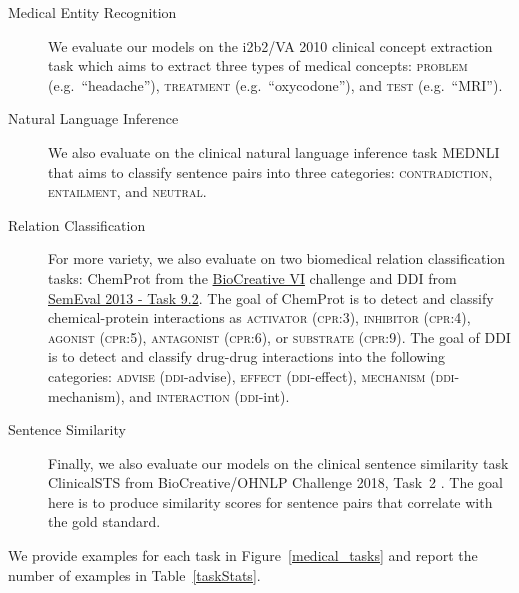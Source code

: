 \documentclass[11pt]{article}
\begin{document}
\begin{description}
    \item[Medical Entity Recognition] We evaluate our models on the i2b2/VA 2010 \cite{uzuner20112010} clinical concept extraction task which aims to extract three types of medical concepts: \textsc{problem} (e.g.\ ``headache''), \textsc{treatment} (e.g.\ ``oxycodone''), and \textsc{test} (e.g.\ ``MRI'').

    \item[Natural Language Inference] We also evaluate on the clinical natural language inference task MEDNLI \cite{romanov-shivade-2018-lessons} that aims to classify sentence pairs into three categories: \textsc{contradiction}, \textsc{entailment}, and \textsc{neutral}.

    \item[Relation Classification] For more variety, we also evaluate on two biomedical relation classification tasks: ChemProt \cite{krallinger2017overview} from the \href{https://biocreative.bioinformatics.udel.edu/resources/corpora/chemprot-corpus-biocreative-vi/}{BioCreative VI} challenge and DDI \cite{herrero2013ddi} from \href{https://www.cs.york.ac.uk/semeval-2013/task9/}{SemEval 2013 - Task 9.2}. The goal of ChemProt is to detect and classify chemical-protein interactions as \textsc{activator (cpr:3), inhibitor (cpr:4), agonist (cpr:5), antagonist (cpr:6)}, or \textsc{substrate (cpr:9)}. The goal of DDI is to detect and classify drug-drug interactions into the following categories:  \textsc{advise} (\textsc{ddi}-advise), \textsc{effect} (\textsc{ddi}-effect), \textsc{mechanism} (\textsc{ddi}-mechanism), and \textsc{interaction} (\textsc{ddi}-int). 
    
    \item[Sentence Similarity] Finally, we also evaluate our models on the clinical sentence similarity task ClinicalSTS \cite{wang2018medsts} from BioCreative/OHNLP Challenge 2018, Task~2 \cite{wang2018overview}. The goal here is to produce similarity scores for sentence pairs that correlate with the gold standard.

\end{description}

We provide examples for each task in Figure~\ref{medical_tasks} and report the number of examples in Table~\ref{taskStats}.

\begin{table}[htbp]
\centering
\setlength{\tabcolsep}{8pt}
\centering\caption{Number of examples of each evaluation task.}\label{taskStats}
\end{table}
\end{document}
